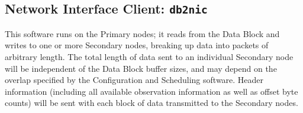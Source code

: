 \subsection{Network Interface Client: {\tt db2nic}}

This software runs on the Primary nodes; it reads from the Data Block
and writes to one or more Secondary nodes, breaking up data into
packets of arbitrary length.  The total length of data sent to an
individual Secondary node will be independent of the Data Block buffer
sizes, and may depend on the overlap specified by the Configuration
and Scheduling software.  Header information (including all available
observation information as well as offset byte counts) will be sent
with each block of data transmitted to the Secondary nodes.
